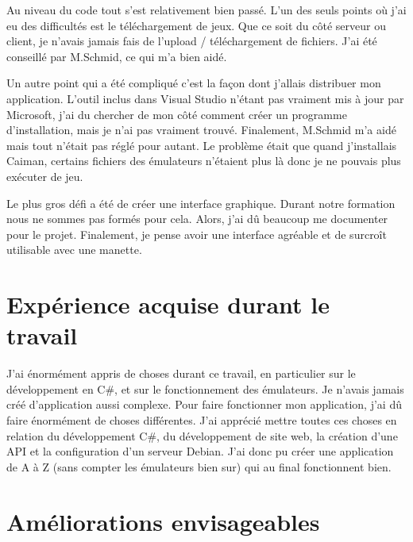 \documentclass[a4paper,12pt,french]{sphinxmanual}
\begin{document}
\sphinxAtStartPar
Au niveau du code tout s’est relativement bien passé. L’un des seuls points où j’ai eu des difficultés est le téléchargement de jeux. Que ce soit du côté serveur ou client, je n’avais jamais fais de l’upload / téléchargement de fichiers. J’ai été conseillé par M.Schmid, ce qui m’a bien aidé.

\sphinxAtStartPar
Un autre point qui a été compliqué c’est la façon dont j’allais distribuer mon application. L’outil inclus dans Visual Studio n’étant pas vraiment mis à jour par Microsoft, j’ai du chercher de mon côté comment créer un programme d’installation, mais je n’ai pas vraiment trouvé. Finalement, M.Schmid m’a aidé mais tout n’était pas réglé pour autant. Le problème était que quand j’installais Caiman, certains fichiers des émulateurs n’étaient plus là donc je ne pouvais plus exécuter de jeu.

\sphinxAtStartPar
Le plus gros défi a été de créer une interface graphique. Durant notre formation nous ne sommes pas formés pour cela. Alors, j’ai dû beaucoup me documenter pour le projet. Finalement, je pense avoir une interface agréable et de surcroît utilisable avec une manette.


\section{Expérience acquise durant le travail}
\label{\detokenize{conclusion:experience-acquise-durant-le-travail}}
\sphinxAtStartPar
J’ai énormément appris de choses durant ce travail, en particulier sur le développement en C\#, et sur le fonctionnement des émulateurs. Je n’avais jamais créé d’application aussi complexe. Pour faire fonctionner mon application, j’ai dû faire énormément de choses différentes. J’ai apprécié mettre toutes ces choses en relation du développement C\#, du développement de site web, la création d’une API et la configuration d’un serveur Debian. J’ai donc pu créer une application de A à Z (sans compter les émulateurs bien sur) qui au final fonctionnent bien.


\section{Améliorations envisageables}
\label{\detokenize{conclusion:ameliorations-envisageables}}
\end{document}
